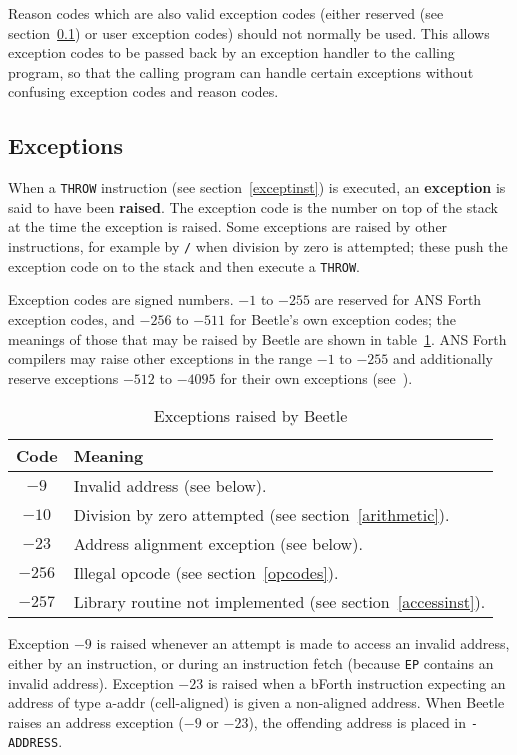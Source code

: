 \documentclass{article}
\newcommand{\spic}[1]{{\spfont\setlength{\baselineskip}{\normalbaselineskip}#1\/}}
\begin{document}
Reason codes which are also valid exception codes (either reserved (see section~\ref{exceptions})
or user exception codes) should not normally be used. This
allows exception codes to be passed back by an exception handler to the calling
program, so that the calling program can handle certain exceptions without
confusing exception codes and reason codes.


\subsection{Exceptions}
\label{exceptions}

When a {\tt THROW} instruction (see section~\ref{exceptinst}) is executed, an
{\bf exception} is said to have been {\bf raised}. The exception code is the number on top of the
stack at the time the exception is raised. Some exceptions are raised by
other instructions, for example by {\tt /} when division by zero is attempted;
these push the exception code on to the stack and then execute a {\tt THROW}.

Exception codes are signed numbers. $-1$ to $-255$ are reserved for ANS Forth
exception codes, and $-256$ to $-511$ for Beetle's own exception codes; the meanings
of those that may be raised by Beetle are shown in table~\ref{excepttable}. ANS
Forth compilers may raise other exceptions in the range $-1$ to $-255$ and
additionally reserve exceptions $-512$ to $-4095$ for their own exceptions
(see~\cite[section 9.3.1]{ANSIforth}).

\begin{table}[htbp]
\begin{center}
\begin{tabular}{cl} \toprule
\bf Code & \bf Meaning \\ \midrule
$-9$ & Invalid address (see below). \\
$-10$ & Division by zero attempted (see section~\ref{arithmetic}). \\
$-23$ & Address alignment exception (see below). \\
$-256$ & Illegal opcode (see section~\ref{opcodes}). \\
$-257$ & Library routine not implemented (see section~\ref{accessinst}). \\ \bottomrule
\end{tabular}
\caption{\label{excepttable}Exceptions raised by Beetle}
\end{center}
\end{table}

Exception $-9$ is raised whenever an attempt is made to access an invalid
address, either by an
instruction, or during an instruction fetch (because {\tt EP} contains an
invalid address). Exception $-23$ is raised when a bForth instruction expecting
an address of type \spic{a-addr} (cell-aligned) is given a non-aligned address.
When Beetle raises an address exception ($-9$ or $-23$), the offending address
is placed in {\tt -ADDRESS}.
\end{document}
